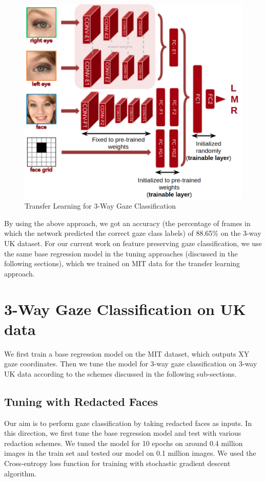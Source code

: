 \begin{figure}[h]
  \centering
    \includegraphics[scale=0.4]{GazePreservingRedaction/TransferLearning}
    \caption{Transfer Learning for 3-Way Gaze Classification}
    \label{fig:TransferLearning}
\end{figure}

By using the above approach, we got an accuracy (the percentage of frames in which the network predicted the correct gaze class labels) of 88.65\% on the 3-way UK dataset. For our current work on feature preserving gaze classification, we use the same base regression model in the tuning approaches (discussed in the following sections), which we trained on MIT data for the transfer learning approach.


\section{3-Way Gaze Classification on UK data}
We first train a base regression model on the MIT dataset, which outputs XY gaze coordinates. Then we tune the model for 3-way gaze classification on 3-way UK data according to the schemes discussed in the following sub-sections.


\subsection{Tuning with Redacted Faces}
Our aim is to perform gaze classification by taking redacted faces as inputs. In this direction, we first tune the base regression model and test with various redaction schemes. We tuned the model for 10 epochs on around 0.4 million images in the train set and tested our model on 0.1 million images. We used the Cross-entropy loss function for training with stochastic gradient descent algorithm.

